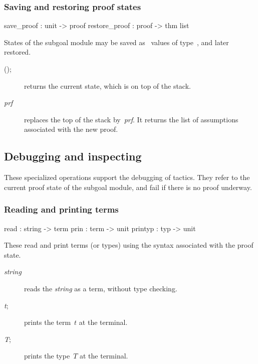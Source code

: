 \subsubsection{Saving and restoring proof states}
\begin{ttbox} 
save_proof    : unit -> proof
restore_proof : proof -> thm list
\end{ttbox}
States of the subgoal module may be saved as \ML\ values of
type~, and later restored.

\begin{description}
\item[();]  
returns the current state, which is on top of the stack.

\item[ {\it prf}]  
replaces the top of the stack by~{\it prf}.  It returns the list of
assumptions associated with the new proof.
\end{description}


\subsection{Debugging and inspecting}
These specialized operations support the debugging of tactics.  They refer
to the current proof state of the subgoal module, and fail if there is no
proof underway.

\subsubsection{Reading and printing terms}
\begin{ttbox} 
read    : string -> term
prin    : term -> unit
printyp : typ -> unit
\end{ttbox}
These read and print terms (or types) using the syntax associated with the
proof state.

\begin{description}
\item[ {\it string}]  
reads the {\it string} as a term, without type checking.

\item[ {\it t};]  
prints the term~$t$ at the terminal.

\item[ {\it T};]  
prints the type~$T$ at the terminal.
\end{description}

